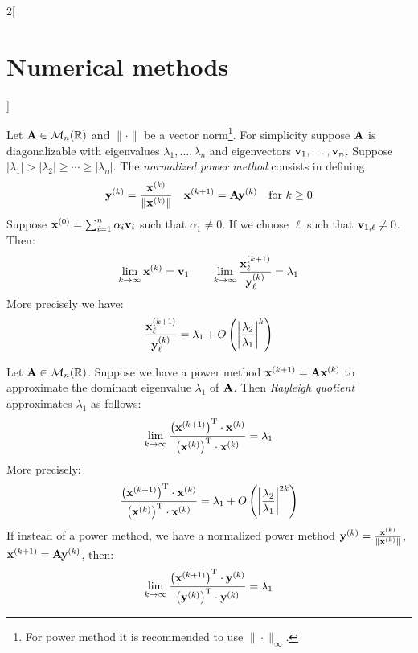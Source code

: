 \documentclass[../../../main.tex]{subfiles}
\begin{document}
\begin{multicols}{2}[\section{Numerical methods}]
\begin{method}
    \end{method}
    \begin{method}
        Let $\vb{A}\in\mathcal{M}_n(\mathbb{R})$ and $\|\cdot\|$ be a vector norm\footnote{For power method it is recommended to use $\|\cdot\|_\infty$.}. For simplicity suppose $\vb{A}$ is diagonalizable with eigenvalues $\lambda_1,\ldots,\lambda_n$ and eigenvectors $\vb{v}_1,\ldots,\vb{v}_n$. Suppose $|\lambda_1|>|\lambda_2|\geq\cdots\geq|\lambda_n|$. The \textit{normalized power method} consists in defining $$\vb{y}^{(k)}=\frac{\vb{x}^{(k)}}{\|\vb{x}^{(k)}\|}\quad\vb{x}^{(k+1)}=\vb{A}\vb{y}^{(k)}\quad\text{for }k\geq 0$$ Suppose $\vb{x}^{(0)}=\sum_{i=1}^n\alpha_i\vb{v}_i$ such that $\alpha_1\ne0$. If we choose $\ell$ such that $\vb{v}_{1,\ell}\ne0$. Then: $$\lim_{k\to\infty}\vb{x}^{(k)}=\vb{v}_1\qquad\lim_{k\to\infty}\frac{\vb{x}_\ell^{(k+1)}}{\vb{y}_\ell^{(k)}}=\lambda_1$$ More precisely we have: $$\frac{\vb{x}_\ell^{(k+1)}}{\vb{y}_\ell^{(k)}}=\lambda_1+O\left(\left|\frac{\lambda_2}{\lambda_1}\right|^k\right)$$
    \end{method}
    \begin{method}
        Let $\vb{A}\in\mathcal{M}_n(\mathbb{R})$. Suppose we have a power method $\vb{x}^{(k+1)}=\vb{A}\vb{x}^{(k)}$ to approximate the dominant eigenvalue $\lambda_1$ of $\vb{A}$. Then \textit{Rayleigh quotient} approximates $\lambda_1$ as follows: $$\lim_{k\to\infty}\frac{\left(\vb{x}^{(k+1)}\right)^\mathrm{T}\cdot \vb{x}^{(k)}}{\left(\vb{x}^{(k)}\right)^\mathrm{T}\cdot\vb{x}^{(k)}}=\lambda_1$$
        More precisely: $$\frac{\left(\vb{x}^{(k+1)}\right)^\mathrm{T}\cdot \vb{x}^{(k)}}{\left(\vb{x}^{(k)}\right)^\mathrm{T}\cdot\vb{x}^{(k)}}=\lambda_1+O\left(\left|\frac{\lambda_2}{\lambda_1}\right|^{2k}\right)$$ If instead of a power method, we have a normalized power method $\vb{y}^{(k)}=\frac{\vb{x}^{(k)}}{\|\vb{x}^{(k)}\|}$, $\vb{x}^{(k+1)}=\vb{A}\vb{y}^{(k)}$, then: $$\lim_{k\to\infty}\frac{\left(\vb{x}^{(k+1)}\right)^\mathrm{T}\cdot \vb{y}^{(k)}}{\left(\vb{y}^{(k)}\right)^\mathrm{T}\cdot\vb{y}^{(k)}}=\lambda_1$$
    \end{method}
    \begin{method}

\end{method}
\end{multicols}
\end{document}
